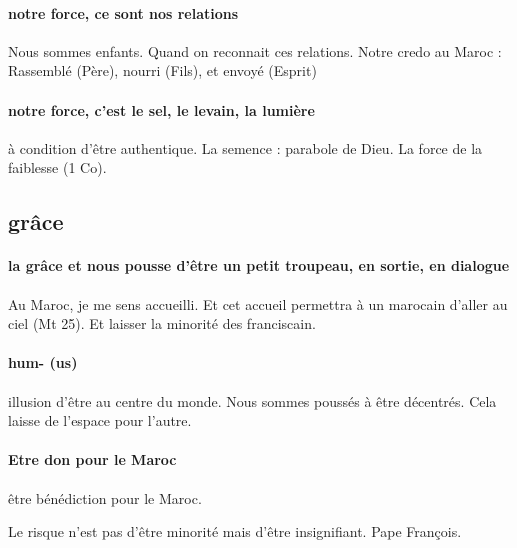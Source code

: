 \paragraph{notre force, ce sont nos relations } Nous sommes enfants. Quand on reconnait ces relations. Notre credo au Maroc : Rassemblé (Père), nourri (Fils), et envoyé (Esprit)
\paragraph{notre force, c’est le sel, le levain, la lumière} à condition d’être authentique. La semence : parabole de Dieu. La force de la faiblesse (1 Co).

\subsection{grâce}
\paragraph{la grâce et nous pousse d’être un petit troupeau, en sortie, en dialogue} Au Maroc, je me sens accueilli. Et cet accueil permettra à un marocain d’aller au ciel (Mt 25).
Et laisser la minorité des franciscain.
\paragraph{hum- (us) } illusion d’être au centre du monde. Nous sommes poussés à être décentrés. Cela laisse de l’espace pour l’autre. 
\paragraph{Etre don pour le Maroc} être bénédiction pour le Maroc.

\begin{Synthesis}
Le risque n’est pas d’être minorité mais d’être insignifiant. Pape François.
\end{Synthesis}






